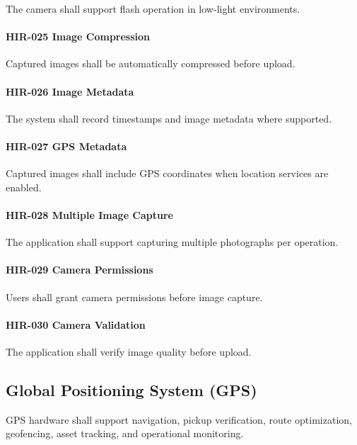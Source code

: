 The camera shall support flash operation in low-light environments.

\paragraph{HIR-025 Image Compression}

Captured images shall be automatically compressed before upload.

\paragraph{HIR-026 Image Metadata}

The system shall record timestamps and image metadata where supported.

\paragraph{HIR-027 GPS Metadata}

Captured images shall include GPS coordinates when location services
are enabled.

\paragraph{HIR-028 Multiple Image Capture}

The application shall support capturing multiple photographs per
operation.

\paragraph{HIR-029 Camera Permissions}

Users shall grant camera permissions before image capture.

\paragraph{HIR-030 Camera Validation}

The application shall verify image quality before upload.


\subsection{Global Positioning System (GPS)}

GPS hardware shall support navigation, pickup verification, route
optimization, geofencing, asset tracking, and operational monitoring.

